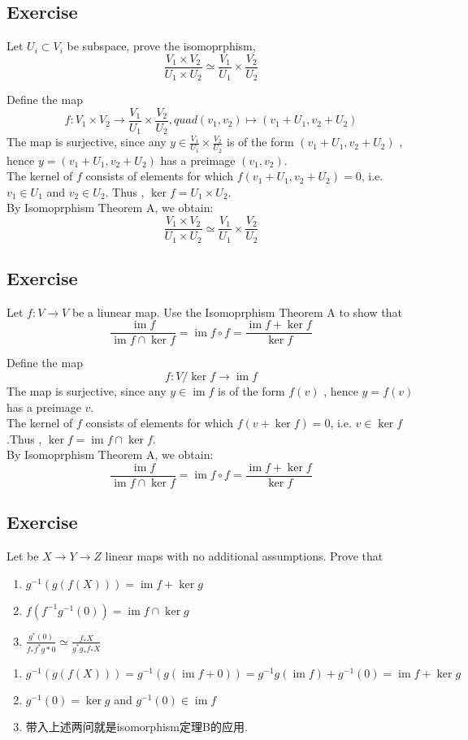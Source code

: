 \documentclass[11pt]{ctexart}
\theoremstyle{definition}
\numberwithin{equation}{section}
\newcommand{\op}[1]{\operatorname{#1}}%
\theoremstyle{definition}
\theoremstyle{remark}
\begin{document}
\subsection{Exercise}
Let $U_i\subset V_i$ be subspace, prove the isomoprphism,
\[\frac{V_1\times V_2}{U_1\times U_2} \simeq \frac{V_1}{U_1}\times \frac{V_2}{U_2}\]
\begin{aaa}
    Define the map \[f: V_1\times V_2 \to \frac{V_1}{U_1}\times \frac{V_2}{U_2},quad (v_1,v_2) \mapsto (v_1+U_1,v_2+U_2)\]
    The map is surjective, since any $y \in \frac{V_1}{U_1}\times \frac{V_2}{U_2}$ is of the form $(v_1+U_1,v_2+U_2)$ , hence $y=(v_1+U_1,v_2+U_2)$ has a preimage $(v_1,v_2)$.\\
    The kernel of $f$ consists of elements for which $f(v_1+U_1,v_2+U_2)=0$, i.e. $v_1 \in U_1$ and $v_2 \in U_2$. Thus , $\ker f= U_1\times U_2$.\\
    By Isomoprphism Theorem A, we obtain:\[\frac{V_1\times V_2}{U_1\times U_2} \simeq \frac{V_1}{U_1}\times \frac{V_2}{U_2}\]
\end{aaa}
\subsection{Exercise}
Let $f: V\to V$ be a liunear map. Use the Isomoprphism Theorem A to show that  \[\frac{\op{im}f}{\op{im}f\cap \ker f}=\op{im}f\circ f=\frac{\op{im}f+\ker f}{\ker f}\]
\begin{aaa}
    Define the map \[f: V/\ker f \to \op{im}f\]
    The map is surjective, since any $y \in \op{im}f$ is of the form $f(v)$ , hence $y=f(v)$ has a preimage $v$.\\
    The kernel of $f$ consists of elements for which $f(v+\ker f)=0$, i.e. $v \in \ker f$ .Thus , $\ker f= \op{im}f\cap \ker f$.\\
    By Isomoprphism Theorem A, we obtain:\[\frac{\op{im}f}{\op{im}f\cap \ker f}=\op{im}f\circ f=\frac{\op{im}f+\ker f}{\ker f}\]
\end{aaa}
\subsection{Exercise}
Let be $X\to Y \to Z$ linear maps with no additional assumptions. Prove that
\begin{enumerate}
    \item $g^{-1}(g(f(X)))=\op{im}f +\ker g$
    \item $f(f^{-1}g^{-1}(0))=\op{im}f \cap \ker g$
    \item $\frac{g^*(0)}{f_*f^*g*0}\simeq \frac{f_*X}{g^*g_*f_*X}$
\end{enumerate}
\begin{aaa}
    \begin{enumerate}
        \item $g^{-1}(g(f(X)))=g^{-1}(g(\op{im}f+0))=g^{-1}g(\op{im}f)+g^{-1}(0)=\op{im}f+\ker g$
        \item $g^{-1}(0)=\ker g$ and $g^{-1}(0) \in \op{im}f$
        \item 带入上述两问就是isomorphism定理B的应用.
    \end{enumerate}
\end{aaa}
\end{document}
